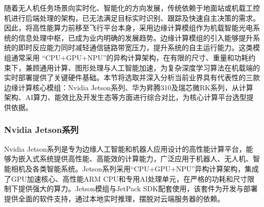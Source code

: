 


随着无人机任务场景向实时化、智能化的方向发展，传统依赖于地面站或机载工控机进行后端处理的架构，已无法满足目标实时识别、跟踪及快速自主决策的需求。因此，将高性能算力前移至飞行平台本身，采用边缘计算模组作为机载智能光电系统的信息处理中枢，已成为业内明确的发展趋势。边缘计算模组的引入能够提升系统的即时反应能力同时减轻通信链路带宽压力，提升系统的自主运行能力。这类模组通常采用 “CPU+GPU+NPU”的异构计算架构，在有限的尺寸、重量和功耗约束下，兼顾通用计算、图形处理与人工智能加速，为复杂深度学习算法在机载端的实时部署提供了关键硬件基础。本节将选取并深入分析当前业界具有代表性的三款边缘计算核心模组：Nvidia Jetson系列、华为昇腾310及瑞芯微RK系列，从计算架构、AI算力、能效比及开发生态等方面进行综合对比，为核心计算平台选型提供依据。

\subsubsection{Nvidia Jetson系列}
Nvidia Jetson系列是专为边缘人工智能和机器人应用设计的高性能计算平台，能够为嵌入式系统提供高性能、高能效的计算能力，广泛应用于机器人、无人机、智能相机及各类智能系统。Jetson系列采用“CPU+GPU+NPU”异构计算架构，集成了GPU加速核心、高性能ARM CPU和专用AI处理单元，在严格的功耗和尺寸限制下提供强大的算力。Jetson模组与JetPack SDK配套使用，该套件为开发与部署提供全面的软件支持，通过本地实时推理，摆脱对云端服务器的依赖。

